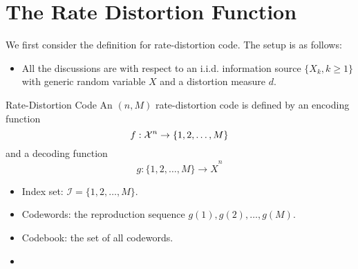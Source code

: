 \documentclass[../main.tex]{subfiles}
\begin{document}
\section{The Rate Distortion Function}
We first consider the definition for rate-distortion code. The setup is as follows: 
\begin{itemize}
    \item All the discussions are with respect to an i.i.d. information source $\{X_k,k\geq 1\}$ with generic random variable $X$ and a distortion measure $d.$
\end{itemize}
\begin{gbox}{Rate-Distortion Code}
    An $(n,M)$ rate-distortion code is defined by an encoding function \[
    f:\mathcal{X}^n \to \{1,2,\dots, M\}
    \] and a decoding function \[
    g: \{1,2,\dots, M\} \to \hat X^n
    \]
\end{gbox}
\begin{itemize}
    \item Index set: $\mathcal{I} = \{1,2,\dots,M\}.$
    \item Codewords: the reproduction sequence $g(1),g(2),\dots, g(M)$.
    \item Codebook: the set of all codewords.
    \item {}
\end{itemize}
\end{document}
